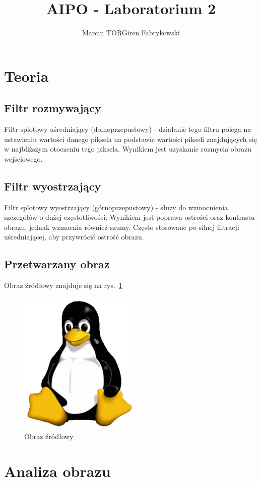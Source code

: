 \documentclass[12pt, a4paper]{article}
\author{Marcin TORGiren Fabrykowski}
\title{AIPO - Laboratorium 2}
\begin{document}
\lstset{language=Python, tabsize=2, inputencoding=utf8, basicstyle=\footnotesize}
\maketitle
\newpage
\section{Teoria}
\subsection{Filtr rozmywający}
Filtr splotowy uśredniający (dolnoprzepustowy) - działanie tego filtru polega na ustawieniu wartości danego piksela na podstawie wartości pikseli znajdujących się w najbliższym otoczeniu tego piksela. Wynikiem jest uzyskanie rozmycia obrazu wejściowego.
\subsection{Filtr wyostrzający}
Filtr splotowy wyostrzający (górnoprzepustowy) - służy do wzmocnienia szczegółów o dużej częstotliwości. Wynikiem jest poprawa ostrości oraz kontrastu obrazu, jednak wzmacnia również szumy. Często stosowane po silnej filtracji uśredniającej, aby przywrócić ostrość obrazu.
\subsection{Przetwarzany obraz}
Obraz źródłowy znajduje się na rys.~\ref{fig:src}
\begin{figure}[p]
\includegraphics{tux}
\caption{Obraz źródłowy}
\label{fig:src}
\end{figure}
\newpage
\section{Analiza obrazu}
\end{document}
